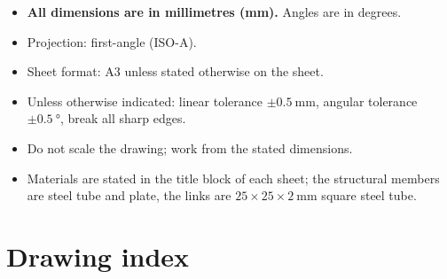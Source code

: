 \documentclass[11pt]{article}
\begin{document}
\begin{itemize}[leftmargin=*,nosep]
  \item \textbf{All dimensions are in millimetres (mm).} Angles are in degrees.
  \item Projection: first-angle (ISO-A).
  \item Sheet format: A3 unless stated otherwise on the sheet.
  \item Unless otherwise indicated: linear tolerance $\pm\SI{0.5}{\milli\metre}$,
        angular tolerance $\pm\SI{0.5}{\degree}$, break all sharp edges.
  \item Do not scale the drawing; work from the stated dimensions.
  \item Materials are stated in the title block of each sheet; the structural members are
        steel tube and plate, the links are $25\times25\times\SI{2}{\milli\metre}$ square
        steel tube.
\end{itemize}

\section{Drawing index}
\end{document}
